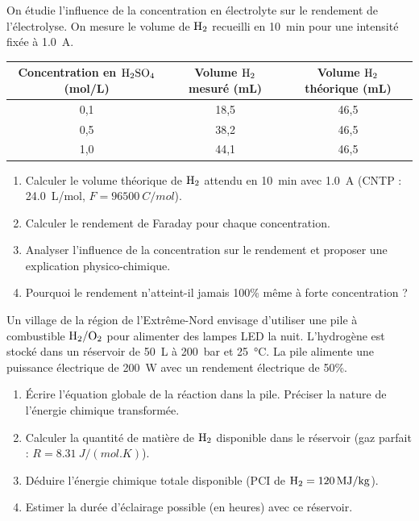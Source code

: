 \documentclass[11pt]{article}
\begin{document}
\begin{exercice}
On étudie l'influence de la concentration en électrolyte sur le rendement de l'électrolyse. On mesure le volume de $\ce{H2}$ recueilli en \SI{10}{min} pour une intensité fixée à \SI{1,0}{A}.
\begin{center}
\begin{tabular}{|c|c|c|}
\hline
Concentration en $\ce{H2SO4}$ (mol/L) & Volume $\ce{H2}$ mesuré (mL) & Volume $\ce{H2}$ théorique (mL) \\
\hline
0,1 & 18,5 & 46,5 \\
0,5 & 38,2 & 46,5 \\
1,0 & 44,1 & 46,5 \\
\hline
\end{tabular}
\end{center}
\begin{enumerate}
    \item Calculer le volume théorique de $\ce{H2}$ attendu en \SI{10}{min} avec \SI{1,0}{A} (CNTP : \SI{24,0}{L/mol}, $F = \SI{96500}{C/mol}$).
    \item Calculer le rendement de Faraday pour chaque concentration.
    \item Analyser l'influence de la concentration sur le rendement et proposer une explication physico-chimique.
    \item Pourquoi le rendement n'atteint-il jamais 100\% même à forte concentration ?
\end{enumerate}
\end{exercice}

\begin{exercice}
Un village de la région de l'Extrême-Nord envisage d'utiliser une pile à combustible $\ce{H2}/\ce{O2}$ pour alimenter des lampes LED la nuit. L'hydrogène est stocké dans un réservoir de \SI{50}{L} à \SI{200}{bar} et \SI{25}{\celsius}. La pile alimente une puissance électrique de \SI{200}{W} avec un rendement électrique de 50\%.
\begin{enumerate}
    \item Écrire l'équation globale de la réaction dans la pile. Préciser la nature de l'énergie chimique transformée.
    \item Calculer la quantité de matière de $\ce{H2}$ disponible dans le réservoir (gaz parfait : $R = \SI{8,31}{J/(mol.K)}$).
    \item Déduire l'énergie chimique totale disponible (PCI de $\ce{H2} = \SI{120}{MJ/kg}$).
    \item Estimer la durée d'éclairage possible (en heures) avec ce réservoir.
\end{enumerate}
\end{exercice}
\end{document}
